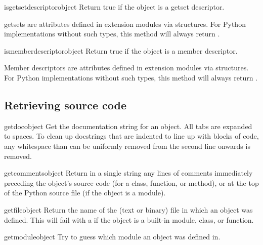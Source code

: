 \begin{funcdesc}{isgetsetdescriptor}{object}
  Return true if the object is a getset descriptor.

  getsets are attributes defined in extension modules via 
  structures.  For Python implementations without such types, this method will
  always return .
\end{funcdesc}

\begin{funcdesc}{ismemberdescriptor}{object}
  Return true if the object is a member descriptor.

  Member descriptors are attributes defined in extension modules via
   structures.  For Python implementations without such
  types, this method will always return .
\end{funcdesc}

\subsection{Retrieving source code
            \label{inspect-source}}

\begin{funcdesc}{getdoc}{object}
  Get the documentation string for an object.
  All tabs are expanded to spaces.  To clean up docstrings that are
  indented to line up with blocks of code, any whitespace than can be
  uniformly removed from the second line onwards is removed.
\end{funcdesc}

\begin{funcdesc}{getcomments}{object}
  Return in a single string any lines of comments immediately preceding
  the object's source code (for a class, function, or method), or at the
  top of the Python source file (if the object is a module).
\end{funcdesc}

\begin{funcdesc}{getfile}{object}
  Return the name of the (text or binary) file in which an object was
  defined.  This will fail with a  if the object
  is a built-in module, class, or function.
\end{funcdesc}

\begin{funcdesc}{getmodule}{object}
  Try to guess which module an object was defined in.
\end{funcdesc}

